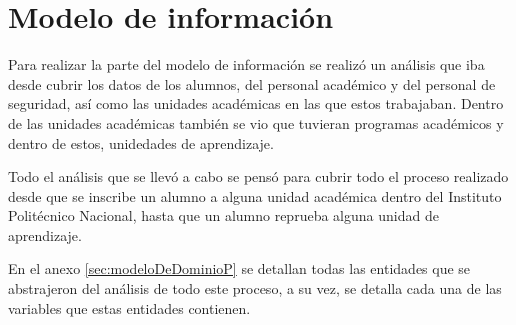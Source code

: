 \section{Modelo de información}
Para realizar la parte del modelo de información se realizó un análisis que iba desde cubrir los datos de los alumnos, del personal académico y del personal de seguridad, así como las unidades académicas en las que estos trabajaban. 
Dentro de las unidades académicas también se vio que tuvieran programas académicos y dentro de estos, unidedades de aprendizaje.

Todo el análisis que se llevó a cabo se pensó para cubrir todo el proceso realizado desde que se inscribe un alumno a alguna unidad académica dentro del Instituto Politécnico Nacional, hasta que un alumno reprueba alguna unidad de aprendizaje. 

En el anexo \ref{sec:modeloDeDominioP} se detallan todas las entidades que se abstrajeron del análisis de todo este proceso, a su vez, se detalla cada una de las variables que estas entidades contienen.